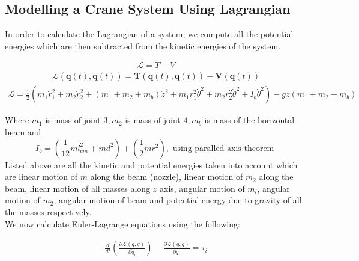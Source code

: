 \documentclass{UoNMCHA}
\numberwithin{equation}{section}
\begin{document}
	
	\subsection{Modelling a Crane System Using Lagrangian}
	
	In order to calculate the Lagrangian of a system, we compute all the potential energies which are then
	subtracted from the kinetic energies of the system.
	
	\begin{align}
	\mathcal{L}=T-V
		\end{align}
		\begin{align}
		\mathcal{L}(\boldsymbol{q}(t), \dot{\boldsymbol{q}}(t))=\boldsymbol{T}(\boldsymbol{q}(t), \dot{\boldsymbol{q}}(t))-\boldsymbol{V}(\boldsymbol{q}(t))
	\end{align}
	\begin{align}
		\mathcal{L}=\frac{1}{2}\left(m_{1} \dot{r}_{1}^{2}+m_{2} \dot{r}_{2}^{2}+\left(m_{1}+m_{2}+m_{b}\right) \dot{z}^{2}+m_{1} r_{1}^{2} \dot{\theta}^{2}+m_{2} r_{2}^{2} \dot{\theta}^{2}+I_{b} \dot{\theta}^{2}\right)-g z\left(m_{1}+m_{2}+m_{b}\right)
	\end{align}

	Where $m_{1}$ is mass of joint $3, m_{2}$ is mass of joint $4, m_{b}$ is mass of the horizontal beam and
	$$
	I_{b}=\left(\frac{1}{12} m l_{c m}^{2}+m d^{2}\right)+\left(\frac{1}{2} m r^{2}\right), \text { using paralled axis theorem }
	$$
	Listed above are all the kinetic and potential energies taken into account which are linear motion of $m$
	along the beam (nozzle), linear motion of $m_{2}$ along the beam, linear motion of all masses along $z$ axis,
	angular motion of $m_{l}$, angular motion of $m_{2}$, angular motion of beam and potential energy due to
	gravity of all the masses respectively. \\
	We now calculate Euler-Lagrange equations using the following:

	\begin{align}
		\frac{d}{d t}\left(\frac{\partial \mathcal{L}(q, \dot{q})}{\partial 	\dot{q}_{\imath}}\right)-\frac{\partial \mathcal{L}(q, \dot{q})}{\partial q_{i}}=\tau_{i}
	\end{align}
\end{document}
